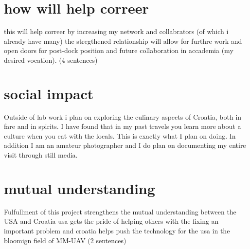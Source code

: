 \documentclass[12pt]{article}
\begin{document}
\section{how will help correer} 
this will help correer by increasing my network and collabrators (of which i already have many)  the 
stregthened relationship will allow for furthre work and open doors for post-dock position and future 
collaboration in accademia (my desired vocation).  (4 sentences)

\section{social impact}
Outside of lab work i plan on exploring the culinary aspects of Croatia, both in fare and in spirits.  I have found that in my past travels you learn more about a culture when you eat with the locals.  This is exactly what I plan on doing.  In addition I am an amateur photographer and I do plan on documenting my entire visit through still media.

\section{mutual understanding}
Fulfullment of this project strengthens the mutual understanding between the USA and Croatia 
usa gets the pride of helping others with the fixing an important problem and croatia helps push the 
technology for the usa in the bloomign field of MM-UAV (2 sentences)
\end{document}
